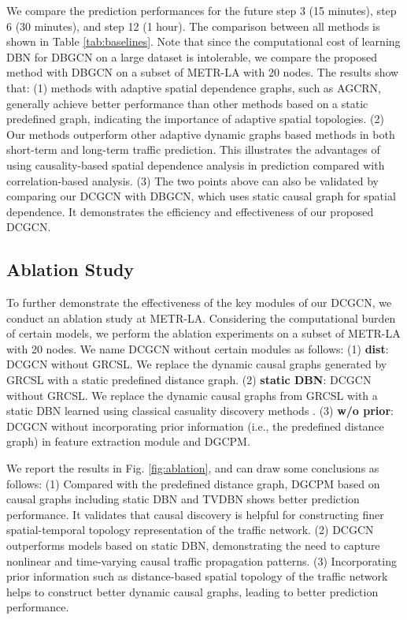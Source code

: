 \documentclass[letterpaper, 10 pt, conference]{ieeeconf}
\begin{document}
We compare the prediction performances for the future step 3 (15 minutes), step 6 (30 minutes), and step 12 (1 hour). The comparison between all methods is shown in Table \ref{tab:baselines}. Note that since the computational cost of learning DBN for DBGCN on a large dataset is intolerable, we compare the proposed method with DBGCN on a subset of METR-LA with 20 nodes. The results show that: (1) methods with adaptive spatial dependence graphs, such as AGCRN, generally achieve better performance than other methods based on a static predefined graph, indicating the importance of adaptive spatial topologies. (2) Our methods outperform other adaptive dynamic graphs based methods in both short-term and long-term traffic prediction. This illustrates the advantages of using causality-based spatial dependence analysis in prediction compared with correlation-based analysis. (3) The two points above can also be validated by comparing our DCGCN with DBGCN, which uses static causal graph for spatial dependence. It demonstrates the efficiency and effectiveness of our proposed DCGCN. 

\subsection{Ablation Study}





To further demonstrate the effectiveness of the key modules of our DCGCN, we conduct an ablation study at METR-LA. Considering the computational burden of certain models, we perform the ablation experiments on a subset of METR-LA with 20 nodes. We name DCGCN without certain modules as follows: (1) \textbf{dist}: DCGCN without GRCSL. We replace the dynamic causal graphs generated by GRCSL with a static predefined distance graph. (2) \textbf{static DBN}: DCGCN without GRCSL. We replace the dynamic causal graphs from GRCSL with a static DBN learned using classical casuality discovery methods \cite{trabelsi2013dynamic}.
(3) \textbf{w/o prior}: DCGCN without incorporating prior information (i.e., the predefined distance graph) in feature extraction module and DGCPM.

We report the results in Fig. \ref{fig:ablation}, and can draw some conclusions as follows: (1) Compared with the predefined distance graph, DGCPM based on causal graphs including static DBN and TVDBN shows better prediction performance. It validates that causal discovery is helpful for constructing finer spatial-temporal topology representation of the traffic network. (2) DCGCN outperforms models based on static DBN, demonstrating the need to capture nonlinear and time-varying causal traffic propagation patterns. (3) Incorporating prior information such as distance-based spatial topology of the traffic network helps to construct better dynamic causal graphs, leading to better prediction performance.
\end{document}
